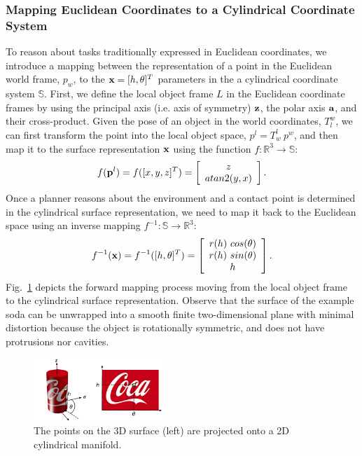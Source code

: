 \documentclass[a4paper,10pt,twocolumn]{article}
\begin{document}
\subsubsection{Mapping Euclidean Coordinates to a Cylindrical Coordinate System}

To reason about tasks traditionally expressed in Euclidean coordinates, we introduce a mapping 
between the representation of a point in the Euclidean world frame, $p_w$, to the $\textbf{x} = [h,\theta]^T$
parameters in the a cylindrical coordinate system $\mathbb{S}$. First, we define the local object frame $L$ in the
Euclidean coordinate frames by using the principal axis (i.e. axis of symmetry) $\textbf{z}$, the polar axis $\textbf{a}$, and
their cross-product. Given the pose of an object in the world coordinates, $T^w_l$, we can first
transform the point into the local object space, $p^l = T^l_w ~ p^w$, and then map it to the surface
representation $\textbf{x}$ using the function $f: \mathbb{R}^3 \rightarrow \mathbb{S}$: 
\begin{equation}
  f(\textbf{p}^l) = f([x,y,z]^T) = \left[ \begin{array}{c} z \\ atan2(y,x) \end{array}\right].
\end{equation}
Once a planner reasons about the environment and a contact point is determined in the cylindrical surface representation,
we need to map it back to the Euclidean space using an inverse mapping $f^{-1}: \mathbb{S} \rightarrow \mathbb{R}^3 $:
\begin{equation}
  f^{-1}(\textbf{x}) = f^{-1}([h, \theta]^T) = \left[ 
  \begin{array}{c}
  r(h) ~ cos(\theta) \\ r(h) ~ sin(\theta)\\ h 
  \end{array} \right]. 
\end{equation}
Fig.~\ref{fig:unfolding} depicts the forward mapping process moving from the local object frame to the cylindrical surface representation. Observe that the surface of the example soda can be unwrapped into a smooth finite two-dimensional plane with minimal distortion because the object is rotationally
symmetric, and does not have protrusions nor cavities. 
\begin{figure}[t!]
  \begin{center}
    \includegraphics[width=0.45\textwidth]{./images/unfolding.pdf} \quad
  \end{center}
  \caption{The points on the 3D surface (left) are projected onto a 2D cylindrical manifold.}
  \label{fig:unfolding} 
\end{figure}
\end{document}
